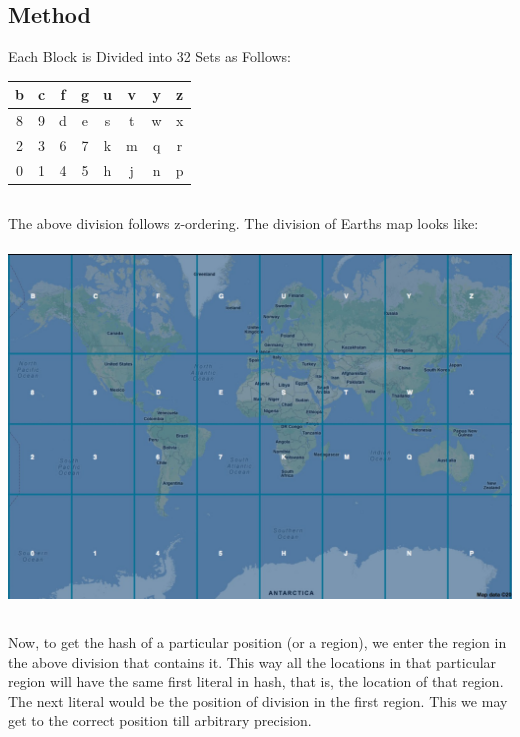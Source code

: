 \documentclass{article}
\begin{document}
    \subsection*{Method}
    Each Block is Divided into 32 Sets as Follows:\\
    \begin{center}
        \begin{tabular}{||c|c|c|c|c|c|c|c||}
        \hline
        \hline
        b & c & f & g & u & v & y & z\\
        \hline
        8 & 9 & d & e & s & t & w & x\\
        \hline
        2 & 3 & 6 & 7 & k & m & q & r\\
        \hline
        0 & 1 & 4 & 5 & h & j & n & p\\
        \hline
        \hline
        \end{tabular}
    \end{center}
    \subsection*{}
    The above division follows z-ordering. The division of Earths map looks like:\\ \\
    \includegraphics[scale=.25]{./Earth.png}
    
    \subsection*{}
    \paragraph{}
    Now, to get the hash of a particular position (or a region), we enter the region in the above division that contains it. This way all the locations in that particular region will have the same first literal in hash, that is, the location of that region. The next literal would be the position of division in the first region. This we may get to the correct position till arbitrary precision.
    \par 
    
\end{document}

